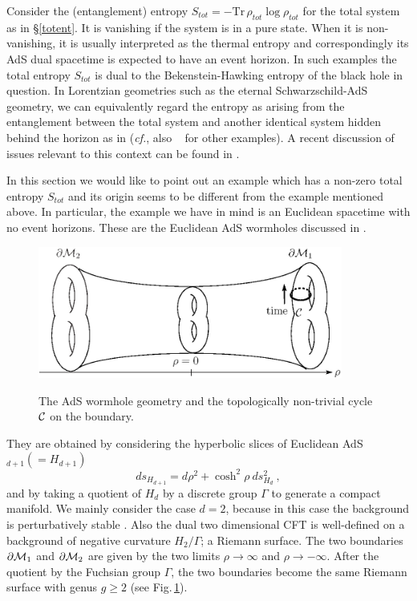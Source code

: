 \documentclass[12pt]{article}
\def\sec#1{\S \;\ref{#1}}
\def\fig#1{Fig.\,\ref{#1}}
\def\cf{{\it cf.}}
\def\p{\partial}
\def\p{\partial}
\def\p{\partial}
\def\bdy{\p{\cal M}}
\begin{document}
 Consider the (entanglement) entropy $S_{tot}=-\mbox{Tr} \, \rho_{tot} \log \rho_{tot}$ for the total system as in \sec{totent}. It is vanishing if the system is in a pure state. When it is non-vanishing, it is usually interpreted as the
thermal entropy and correspondingly its AdS dual spacetime is
expected to have an event horizon. In such examples the total
entropy $S_{tot}$ is dual to the Bekenstein-Hawking entropy of the
black hole in question. In Lorentzian geometries such as the eternal
Schwarzschild-AdS geometry,  we can equivalently regard the entropy
as arising from the entanglement between the total system and
another identical system hidden behind the horizon as in
\cite{Maldacena:2001kr} (\cf, also ~\cite{Freivogel:2005qh} for
other examples). A recent discussion of issues relevant to this
context can be found in \cite{Balasubramanian:2007qv}.

In this section we would like to point out an example which has a
non-zero total entropy $S_{tot}$ and its origin seems to be
different from the example mentioned above. In particular, the example we have in mind is an Euclidean spacetime with no event horizons. These are the
Euclidean AdS wormholes discussed in \cite{Maldacena:2004rf}.
\begin{figure}
\begin{center}
\includegraphics[width=10cm]{wormholegenus}\\
\caption{The AdS wormhole geometry and the topologically non-trivial cycle ${\cal C}$ on the boundary.}\label{wormhole}
\end{center}
\end{figure}
They are obtained by considering the hyperbolic slices of Euclidean
AdS$_{d+1}(=H_{d+1})$
%
\begin{equation}\label{MM}
ds_{H_{d+1}}=d\rho^2+\cosh^2\rho\ ds^2_{H_{d}} \ ,
\end{equation}
%
and by taking a quotient of $H_d$ by a discrete group $\Gamma$ to generate a compact manifold. We mainly consider the case $d=2$, because in this case the background is perturbatively stable \cite{Maldacena:2004rf}.  Also the dual two dimensional CFT is well-defined on a background of negative curvature $H_{2}/\Gamma$; a Riemann surface. The two boundaries $\bdy_1$ and $\bdy_2$ are given by the two limits $\rho\to \infty$ and $\rho\to -\infty$. After the quotient by the
Fuchsian group $\Gamma$, the two boundaries become the same Riemann surface
with genus $g\geq 2$ (see \fig{wormhole}).
\end{document}
